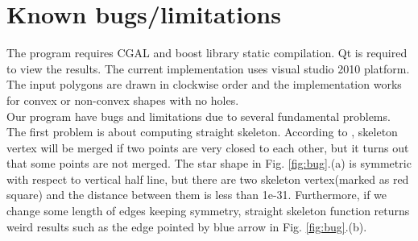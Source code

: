 \documentclass[11pt]{article}
\begin{document}
\section{Known bugs/limitations}
The program requires CGAL and boost library static compilation. Qt is required to view the results. The current implementation uses visual studio 2010 platform. The input polygons are drawn in clockwise order and the implementation works for convex or non-convex shapes with no holes.\\
Our program have bugs and limitations due to several fundamental problems. The first problem is about computing straight skeleton. According to \cite{CGALss}, skeleton vertex will be merged if two points are very closed to each other, but it turns out that some points are not merged. The star shape in Fig. \ref{fig:bug}.(a) is symmetric with respect to vertical half line, but there are two skeleton vertex(marked as red square) and the distance between them is less than 1e-31. Furthermore, if we change some length of edges keeping symmetry, straight skeleton function returns weird results such as the edge pointed by blue arrow in Fig. \ref{fig:bug}.(b).
\end{document}
